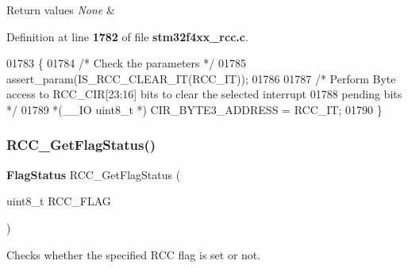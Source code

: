 \begin{DoxyRetVals}{Return values}
{\em None} & \\
\hline
\end{DoxyRetVals}


Definition at line \textbf{ 1782} of file \textbf{ stm32f4xx\+\_\+rcc.\+c}.


\begin{DoxyCode}
01783 \{
01784   \textcolor{comment}{/* Check the parameters */}
01785   assert_param(IS_RCC_CLEAR_IT(RCC\_IT));
01786 
01787   \textcolor{comment}{/* Perform Byte access to RCC\_CIR[23:16] bits to clear the selected interrupt}
01788 \textcolor{comment}{     pending bits */}
01789   *(\_\_IO uint8\_t *) CIR_BYTE3_ADDRESS = RCC\_IT;
01790 \}
\end{DoxyCode}
\mbox{\label{group__RCC__Group4_ga2897bdc52f272031c44fb1f72205d295}} 
\subsubsection{R\+C\+C\+\_\+\+Get\+Flag\+Status()}
{\footnotesize\ttfamily \textbf{ Flag\+Status} R\+C\+C\+\_\+\+Get\+Flag\+Status (\begin{DoxyParamCaption}\item[{uint8\+\_\+t}]{R\+C\+C\+\_\+\+F\+L\+AG }\end{DoxyParamCaption})}



Checks whether the specified R\+CC flag is set or not. 


